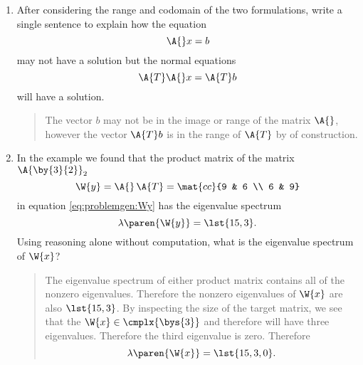 \clearpage

\begin{enumerate}
\item After considering the range and codomain of the two formulations, write a single sentence to explain how the equation
\begin{equation}
  \A{}x=b
\end{equation}
may not have a solution but the normal equations
\begin{equation}
  \A{T}\A{}x=\A{T}b
\end{equation}
will have a solution. 
\begin{quotation}
The vector $b$ may not be in the image or range of the matrix $\A{}$, however the vector $\A{T}b$ is in the range of $\A{T}$ by of construction.
\end{quotation}
\item In the example we found that the product matrix of the matrix $\A{\by{3}{2}}_{2}$
\begin{equation}
   \W{y}=\A{}\,\A{T} =
\mat{cc}
 {9 & 6 \\
  6 & 9} 
\end{equation}
in equation \eqref{eq:problemgen:Wy} has the eigenvalue spectrum
\begin{equation}
  \lambda\paren{\W{y}} = \lst{15,3}.
\end{equation}
Using reasoning alone without computation, what is the eigenvalue spectrum of $\W{x}$?
\begin{quotation}
  The eigenvalue spectrum of either product matrix contains all of the nonzero eigenvalues. Therefore the nonzero eigenvalues of $\W{x}$ are also $\lst{15,3}$. By inspecting the size of the target matrix, we see that the $\W{x}\in\cmplx{\bys{3}}$ and therefore will have three eigenvalues. Therefore the third eigenvalue is zero. Therefore
\begin{equation}
  \lambda\paren{\W{x}}=\lst{15,3,0}.
\end{equation}
\end{quotation}
\end{enumerate}

\endinput